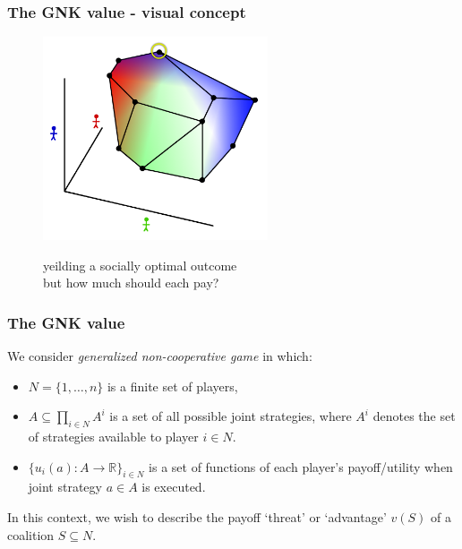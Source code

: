 \begin{frame} \frametitle{The GNK value - visual concept} \begin{figure} \begin{center} \includegraphics[height=6cm]{figs/pp9} \end{center} yeilding a socially optimal outcome \\ but how much should each pay? \end{figure} \end{frame}



\begin{frame}
\frametitle{The GNK value}
We consider \textit{generalized non-cooperative game} in which:
\begin{itemize}
\item	$N=\{1,\dots,n\}$ is a finite set of players,
\item	$A\subseteq \prod_{i\in N}A^i$ is a set of all possible joint strategies, where $A^i$ denotes the set of strategies available to player $i\in N$.
\item	$\{u_i(a) : A\rightarrow \mathbb{R}\}_{i\in N}$ is a set of functions of each player's payoff/utility when joint strategy $a\in A$ is executed.
\end{itemize}

In this context, we wish to describe the payoff `threat' or `advantage' $v(S)$ of a coalition $S\subseteq N$.
\end{frame}





